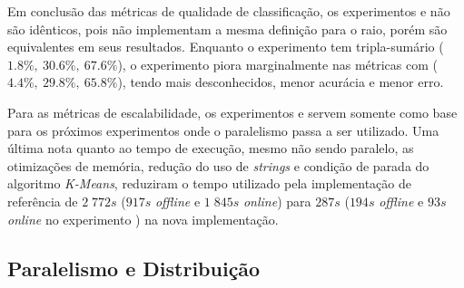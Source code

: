 

Em conclusão das métricas de qualidade de classificação, os experimentos \expA e
\expB não são idênticos, pois não implementam a mesma definição para o raio,
porém são equivalentes em seus resultados.
Enquanto o experimento \expA tem tripla-sumário
($1.8\%,\: 30.6\%,\: 67.6\%$),
o experimento \expB piora marginalmente nas métricas com
($4.4\%,\: 29.8\%,\: 65.8\%$),
tendo mais desconhecidos, menor acurácia e menor erro.

Para as métricas de escalabilidade, os experimentos \expA e
\expB servem somente como base
para os próximos experimentos onde o paralelismo passa a ser utilizado.
Uma última nota quanto ao tempo de execução, mesmo não sendo paralelo, as
otimizações de memória, redução do uso de \emph{strings} e condição de parada do
algoritmo \emph{K-Means}, reduziram o tempo utilizado pela implementação de
referência de $2\;772s$ ($917s$ \emph{offline} e $1\;845s$ \emph{online}) para
$287s$ ($194s$ \emph{offline} e $93s$ \emph{online} no experimento \expB) na
nova implementação.

\subsection{Paralelismo e Distribuição}
\label{subsec:parallel-dist}


